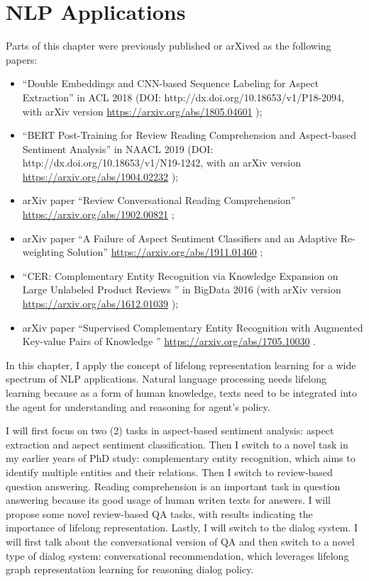 \chapter{NLP Applications}
\label{chap6:nlp}

Parts of this chapter were previously published or arXived as the following papers:
\begin{itemize}
\item ``Double Embeddings and CNN-based Sequence Labeling for Aspect Extraction'' in ACL 2018 \cite{xu_acl2018} (DOI: http://dx.doi.org/10.18653/v1/P18-2094, with arXiv version \url{https://arxiv.org/abs/1805.04601} \cite{xu2018double});\\
\item ``BERT Post-Training for Review Reading Comprehension and Aspect-based Sentiment Analysis'' in NAACL 2019 \cite{xu2019bert} (DOI: http://dx.doi.org/10.18653/v1/N19-1242, with an arXiv version \url{https://arxiv.org/abs/1904.02232} \cite{xu2019bert_arxiv});\\
\item arXiv paper ``Review Conversational Reading Comprehension'' \url{https://arxiv.org/abs/1902.00821} \cite{xu2019review};\\
\item arXiv paper ``A Failure of Aspect Sentiment Classifiers and an Adaptive Re-weighting Solution'' \url{https://arxiv.org/abs/1911.01460} \cite{xu2019afailure};\\
\item ``CER: Complementary Entity Recognition via Knowledge Expansion on Large Unlabeled Product Reviews
'' in BigData 2016 \cite{xu2016CER} (with arXiv version \url{https://arxiv.org/abs/1612.01039} \cite{xu2016cer_arxiv});\\
\item arXiv paper ``Supervised Complementary Entity Recognition with Augmented Key-value Pairs of Knowledge
'' \url{https://arxiv.org/abs/1705.10030} \cite{xu2017supervised}.
\end{itemize}

In this chapter, I apply the concept of lifelong representation learning for a wide spectrum of NLP applications.
Natural language processing needs lifelong learning because as a form of human knowledge, texts need to be integrated into the agent for understanding and reasoning for agent's policy.

I will first focus on two (2) tasks in aspect-based sentiment analysis: aspect extraction and aspect sentiment classification.
Then I switch to a novel task in my earlier years of PhD study: complementary entity recognition, which aims to identify multiple entities and their relations.
Then I switch to review-based question answering. Reading comprehension is an important task in question answering because its good usage of human writen texts for answers. I will propose some novel review-based QA tasks, with results indicating the importance of lifelong representation.
Lastly, I will switch to the dialog system.
I will first talk about the conversational version of QA and then switch to a novel type of dialog system: conversational recommendation, which leverages lifelong graph representation learning for reasoning dialog policy.

